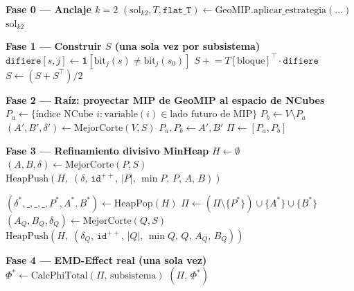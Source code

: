 \begin{algorithm}[H]
\caption{KGeoMIP E4 — Refinamiento divisivo guiado por similitud causal}
\label{alg:kgeomip_e4}
\begin{algorithmic}[1]

\State \textbf{Fase 0 — Anclaje $k=2$}
\State $(\text{sol}_{k2}, T, \texttt{flat\_T}) \leftarrow \text{GeoMIP.aplicar\_estrategia}(\ldots)$
 \Return $\text{sol}_{k2}$ \EndIf

\State \textbf{Fase 1 — Construir $S$ (una sola vez por subsistema)}
    \State $\texttt{difiere}[s,j] \leftarrow \mathbf{1}[\text{bit}_j(s) \neq \text{bit}_j(s_0)]$
    \State $S \mathrel{+}= T[\text{bloque}]^\top \cdot \texttt{difiere}$
  \EndFor
  \State $S \leftarrow (S + S^\top) / 2$
\EndIf

\State \textbf{Fase 2 — Raíz: proyectar MIP de GeoMIP al espacio de NCubes}
\State $P_a \leftarrow \{\text{índice NCube } i : \text{variable}(i) \in \text{lado futuro de MIP}\}$
\State $P_b \leftarrow V \setminus P_a$
\State $(A', B', \delta') \leftarrow \text{MejorCorte}(V, S)$
  \State $P_a, P_b \leftarrow A', B'$ 
\EndIf
\State $\Pi \leftarrow [P_a, P_b]$

\State \textbf{Fase 3 — Refinamiento divisivo MinHeap}
\State $H \leftarrow \emptyset$ 
  \State $(A, B, \delta) \leftarrow \text{MejorCorte}(P, S)$
  \State $\text{HeapPush}(H,\; (\delta,\, \texttt{id}^{++},\, |P|,\, \min P,\, P,\, A,\, B))$
\EndFor

  \State $(\delta^*, \_, \_, \_, P^*, A^*, B^*) \leftarrow \text{HeapPop}(H)$
  \State $\Pi \leftarrow (\Pi \setminus \{P^*\}) \cup \{A^*\} \cup \{B^*\}$
    \State $(A_Q, B_Q, \delta_Q) \leftarrow \text{MejorCorte}(Q, S)$
    \State $\text{HeapPush}(H,\; (\delta_Q,\, \texttt{id}^{++},\, |Q|,\, \min Q,\, Q,\, A_Q,\, B_Q))$
  \EndFor
\EndFor

\State \textbf{Fase 4 — EMD-Effect real (una sola vez)}
\State $\Phi^* \leftarrow \text{CalcPhiTotal}(\Pi,\, \text{subsistema})$
\State \Return $(\Pi,\, \Phi^*)$
\end{algorithmic}
\end{algorithm}

